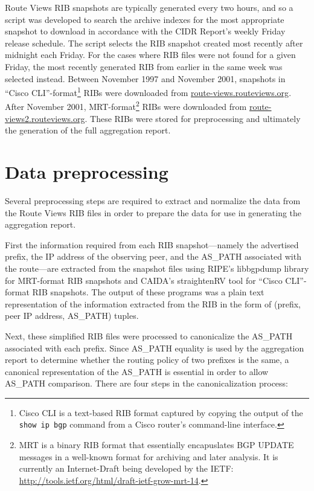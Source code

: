 Route Views RIB snapshots are typically generated every two hours, and so a script was developed to search the archive indexes for the most appropriate snapshot to download in accordance with the CIDR Report's weekly Friday release schedule. The script selects the RIB snapshot created most recently after midnight each Friday. For the cases where RIB files were not found for a given Friday, the most recently generated RIB from earlier in the same week was selected instead. Between November 1997 and November 2001, snapshots in ``Cisco CLI''-format\footnote{Cisco CLI is a text-based RIB format captured by copying the output of the \texttt{show ip bgp} command from a Cisco router's command-line interface.} RIBs were downloaded from \url{route-views.routeviews.org}. After November 2001, MRT-format\footnote{MRT is a binary RIB format that essentially encapuslates BGP UPDATE messages in a well-known format for archiving and later analysis. It is currently an Internet-Draft being developed by the IETF: \url{http://tools.ietf.org/html/draft-ietf-grow-mrt-14}.} RIBs were downloaded from \url{route-views2.routeviews.org}. These RIBs were stored for preprocessing and ultimately the generation of the full aggregation report.

\section{Data preprocessing}

Several preprocessing steps are required to extract and normalize the data from the Route Views RIB files in order to prepare the data for use in generating the aggregation report.

First the information required from each RIB snapshot---namely the advertised prefix, the IP address of the observing peer, and the AS\_PATH associated with the route---are extracted from the snapshot files using RIPE's libbgpdump library \cite{libbgpdump} for MRT-format RIB snapshots and CAIDA's straightenRV tool \cite{straightenrv} for ``Cisco CLI''-format RIB snapshots. The output of these programs was a plain text representation of the information extracted from the RIB in the form of (prefix, peer IP address, AS\_PATH) tuples.

Next, these simplified RIB files were processed to canonicalize the AS\_PATH associated with each prefix. Since AS\_PATH equality is used by the aggregation report to determine whether the routing policy of two prefixes is the same, a canonical representation of the AS\_PATH is essential in order to allow AS\_PATH comparison. There are four steps in the canonicalization process:

